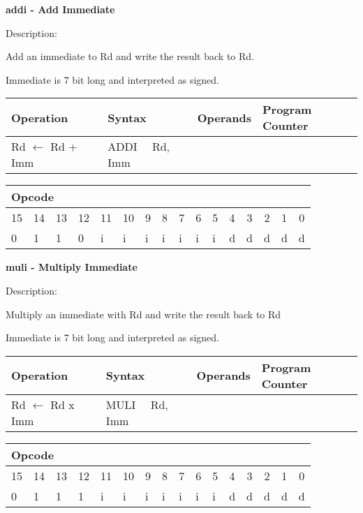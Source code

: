 \documentclass{article}
\begin{document}
\bigskip

\textbf{addi - Add Immediate}

Description:

Add an immediate to Rd and write the result back to Rd.

Immediate is 7 bit long and interpreted as signed.

\begin{tabular}{|l|l|l|l|}
\hline
Operation & Syntax & Operands & Program Counter \\ \hline
Rd $\leftarrow $ Rd + Imm & ADDI \ \ Rd, Imm &  &  \\ \hline
\end{tabular}

\begin{tabular}{|c|c|c|c|c|c|c|c|c|c|c|c|c|c|c|c|}
\hline
\multicolumn{6}{|l|}{Opcode} & \multicolumn{5}{|l|}{} & \multicolumn{5}{|l|}{
} \\ \hline
15 & 14 & 13 & 12 & 11 & 10 & 9 & 8 & 7 & 6 & 5 & 4 & 3 & 2 & 1 & 0 \\ \hline
\multicolumn{1}{|l|}{0} & \multicolumn{1}{|l|}{1} & \multicolumn{1}{|l|}{1}
& \multicolumn{1}{|l|}{0} & \multicolumn{1}{|l|}{i} & \multicolumn{1}{|l|}{i}
& \multicolumn{1}{|l|}{i} & \multicolumn{1}{|l|}{i} & \multicolumn{1}{|l|}{i}
& \multicolumn{1}{|l|}{i} & \multicolumn{1}{|l|}{i} & \multicolumn{1}{|l|}{d}
& \multicolumn{1}{|l|}{d} & \multicolumn{1}{|l|}{d} & \multicolumn{1}{|l|}{d}
& \multicolumn{1}{|l|}{d} \\ \hline
\end{tabular}

\bigskip

\textbf{muli - Multiply Immediate}

Description:

Multiply an immediate with Rd and write the result back to Rd

Immediate is 7 bit long and interpreted as signed.

\begin{tabular}{|l|l|l|l|}
\hline
Operation & Syntax & Operands & Program Counter \\ \hline
Rd $\leftarrow $ Rd x Imm & MULI \ \ Rd, Imm &  &  \\ \hline
\end{tabular}

\begin{tabular}{|c|c|c|c|c|c|c|c|c|c|c|c|c|c|c|c|}
\hline
\multicolumn{6}{|l|}{Opcode} & \multicolumn{5}{|l|}{} & \multicolumn{5}{|l|}{
} \\ \hline
15 & 14 & 13 & 12 & 11 & 10 & 9 & 8 & 7 & 6 & 5 & 4 & 3 & 2 & 1 & 0 \\ \hline
\multicolumn{1}{|l|}{0} & \multicolumn{1}{|l|}{1} & \multicolumn{1}{|l|}{1}
& \multicolumn{1}{|l|}{1} & \multicolumn{1}{|l|}{i} & \multicolumn{1}{|l|}{i}
& \multicolumn{1}{|l|}{i} & \multicolumn{1}{|l|}{i} & \multicolumn{1}{|l|}{i}
& \multicolumn{1}{|l|}{i} & \multicolumn{1}{|l|}{i} & \multicolumn{1}{|l|}{d}
& \multicolumn{1}{|l|}{d} & \multicolumn{1}{|l|}{d} & \multicolumn{1}{|l|}{d}
& \multicolumn{1}{|l|}{d} \\ \hline
\end{tabular}
\end{document}
